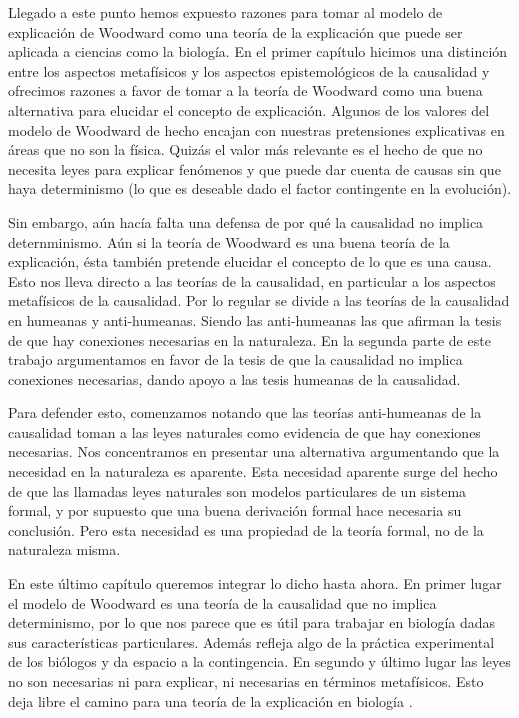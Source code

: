 Llegado a este punto hemos expuesto razones para tomar al modelo de explicación de Woodward como una teoría de la explicación que puede ser aplicada a ciencias como la biología. En el primer capítulo hicimos una distinción entre los aspectos metafísicos y los aspectos epistemológicos de la causalidad y ofrecimos razones a favor de tomar a la teoría de Woodward como una buena alternativa para elucidar el concepto de explicación. Algunos de los valores del modelo de Woodward de hecho encajan con nuestras pretensiones explicativas en áreas que no son la física. Quizás el valor más relevante es el hecho de que no necesita leyes para explicar fenómenos y que puede dar cuenta de causas sin que haya determinismo (lo que es deseable dado el factor contingente en la evolución).

Sin embargo, aún hacía falta una defensa de por qué la causalidad no implica deternminismo. Aún si la teoría de Woodward es una buena teoría de la explicación, ésta también pretende elucidar el concepto de lo que es una causa. Esto nos lleva directo a las teorías de la causalidad, en particular a los aspectos metafísicos de la causalidad. Por lo regular se divide a las teorías de la causalidad en humeanas y anti-humeanas. Siendo las anti-humeanas las que afirman la tesis de que hay conexiones necesarias en la naturaleza. En la segunda parte de este trabajo argumentamos en favor de la tesis de que la causalidad no implica conexiones necesarias, dando apoyo a las tesis humeanas de la causalidad.

Para defender esto, comenzamos notando que las teorías anti-humeanas de la causalidad toman a las leyes naturales como evidencia de que hay conexiones necesarias. Nos concentramos en presentar una alternativa argumentando que la necesidad en la naturaleza es aparente. Esta necesidad aparente surge del hecho de que las llamadas leyes naturales son modelos particulares de un sistema formal, y por supuesto que una buena derivación formal hace necesaria su conclusión. Pero esta necesidad es una propiedad de la teoría formal, no de la naturaleza misma.

En este último capítulo queremos integrar lo dicho hasta ahora. En primer lugar el modelo de Woodward es una teoría de la causalidad que no implica determinismo, por lo que nos parece que es útil para trabajar en biología dadas sus características particulares. Además refleja algo de la práctica experimental de los biólogos y da espacio a la contingencia. En segundo y último lugar las leyes no son necesarias ni para explicar, ni necesarias en términos metafísicos. Esto deja libre el camino para una teoría de la explicación en biología \cite{Brandon1997}.



